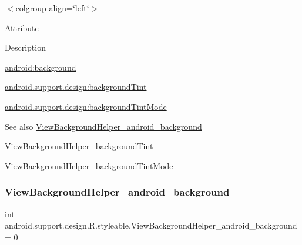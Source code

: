 \tabulinesep=1mm
\begin{longtabu} spread 0pt [c]{*{0}{|X[-1]}|}
\hline
\end{longtabu}
$<$colgroup align=\char`\"{}left\char`\"{}$>$ 

Attribute

Description 

{\ttfamily \hyperlink{classandroid_1_1support_1_1design_1_1R_1_1styleable_ac588ebcd504382c5ace2ad9a48ce0511}{android\+:background}}

{\ttfamily \hyperlink{classandroid_1_1support_1_1design_1_1R_1_1styleable_a2e9994ef36fe7a2256990b68a1a32e6b}{android.\+support.\+design\+:background\+Tint}}

{\ttfamily \hyperlink{classandroid_1_1support_1_1design_1_1R_1_1styleable_ad51f84023757d5598448db4232fbad8c}{android.\+support.\+design\+:background\+Tint\+Mode}}

\begin{DoxySeeAlso}{See also}
\hyperlink{classandroid_1_1support_1_1design_1_1R_1_1styleable_ac588ebcd504382c5ace2ad9a48ce0511}{View\+Background\+Helper\+\_\+android\+\_\+background} 

\hyperlink{classandroid_1_1support_1_1design_1_1R_1_1styleable_a2e9994ef36fe7a2256990b68a1a32e6b}{View\+Background\+Helper\+\_\+background\+Tint} 

\hyperlink{classandroid_1_1support_1_1design_1_1R_1_1styleable_ad51f84023757d5598448db4232fbad8c}{View\+Background\+Helper\+\_\+background\+Tint\+Mode} 
\end{DoxySeeAlso}
\mbox{\label{classandroid_1_1support_1_1design_1_1R_1_1styleable_ac588ebcd504382c5ace2ad9a48ce0511}} 
\subsubsection{\texorpdfstring{View\+Background\+Helper\+\_\+android\+\_\+background}{ViewBackgroundHelper\_android\_background}}
{\footnotesize\ttfamily int android.\+support.\+design.\+R.\+styleable.\+View\+Background\+Helper\+\_\+android\+\_\+background = 0\hspace{0.3cm}{\ttfamily [static]}}

